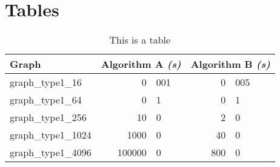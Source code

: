 \documentclass[twoside]{article}
\begin{document}
\begin{appendices}
\label{app}

\section{Tables} %
\label{app:tab}
\begin{table}[h]\centering
\label{app:tab:0}
\begin{tabular}{|l|r@{.}l|r@{.}l|}
\hline
Graph	
	& \multicolumn{2}{l|}{Algorithm A \emph{(s)}}
	& \multicolumn{2}{l|}{Algorithm B \emph{(s)}} \\
\hline
graph\_{}type1\_{}16
	& 0	& 001
	& 0	& 005 \\
graph\_{}type1\_{}64
	& 0	& 1	
	& 0	& 1 \\
graph\_{}type1\_{}256
	& 10	& 0	
	& 2		& 0\\
graph\_{}type1\_{}1024
	& 1000	& 0 
	& 40	& 0 \\
graph\_{}type1\_{}4096
	& 100000	& 0
	& 800		& 0 \\
\hline
\end{tabular}
\caption{This is a table}
\end{table}

\end{appendices}
\end{document}
